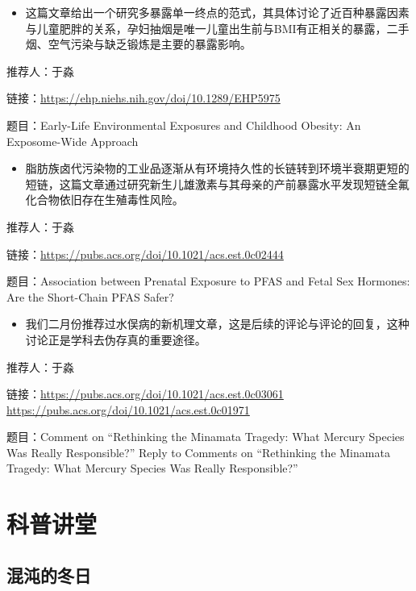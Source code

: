\documentclass[
]{book}
\providecommand{\tightlist}{%
  \setlength{\itemsep}{0pt}\setlength{\parskip}{0pt}}
\begin{document}
\begin{itemize}
\tightlist
\item
  这篇文章给出一个研究多暴露单一终点的范式，其具体讨论了近百种暴露因素与儿童肥胖的关系，孕妇抽烟是唯一儿童出生前与BMI有正相关的暴露，二手烟、空气污染与缺乏锻炼是主要的暴露影响。
\end{itemize}

推荐人：于淼

链接：\url{https://ehp.niehs.nih.gov/doi/10.1289/EHP5975}

题目：Early-Life Environmental Exposures and Childhood Obesity: An Exposome-Wide Approach

\begin{itemize}
\tightlist
\item
  脂肪族卤代污染物的工业品逐渐从有环境持久性的长链转到环境半衰期更短的短链，这篇文章通过研究新生儿雄激素与其母亲的产前暴露水平发现短链全氟化合物依旧存在生殖毒性风险。
\end{itemize}

推荐人：于淼

链接：\url{https://pubs.acs.org/doi/10.1021/acs.est.0c02444}

题目：Association between Prenatal Exposure to PFAS and Fetal Sex Hormones: Are the Short-Chain PFAS Safer?

\begin{itemize}
\tightlist
\item
  我们二月份推荐过水俣病的新机理文章，这是后续的评论与评论的回复，这种讨论正是学科去伪存真的重要途径。
\end{itemize}

推荐人：于淼

链接：\url{https://pubs.acs.org/doi/10.1021/acs.est.0c03061} \url{https://pubs.acs.org/doi/10.1021/acs.est.0c01971}

题目：Comment on ``Rethinking the Minamata Tragedy: What Mercury Species Was Really Responsible?'' Reply to Comments on ``Rethinking the Minamata Tragedy: What Mercury Species Was Really Responsible?''

\hypertarget{ux79d1ux666eux8bb2ux5802}{%
\chapter{科普讲堂}\label{ux79d1ux666eux8bb2ux5802}}

\hypertarget{ux6df7ux6c8cux7684ux51acux65e5}{%
\section{混沌的冬日}\label{ux6df7ux6c8cux7684ux51acux65e5}}
\end{document}

